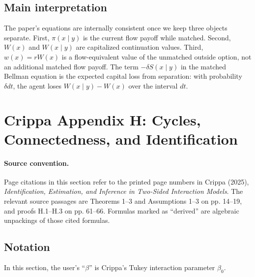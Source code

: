 \documentclass[11pt]{article}
\begin{document}
\subsection{Main interpretation}

The paper's equations are internally consistent once we keep three objects
separate. First, $\pi(x\mid y)$ is the current flow payoff while matched. Second,
$W(x)$ and $W(x\mid y)$ are capitalized continuation values. Third, $w(x)=rW(x)$
is a flow-equivalent value of the unmatched outside option, not an additional
matched flow payoff. The term $-\delta S(x\mid y)$ in the matched Bellman
equation is the expected capital loss from separation: with probability
$\delta dt$, the agent loses $W(x\mid y)-W(x)$ over the interval $dt$.

\section{Crippa Appendix H: Cycles, Connectedness, and Identification}

\paragraph{Source convention.}
Page citations in this section refer to the printed page numbers in Crippa
(2025), \emph{Identification, Estimation, and Inference in Two-Sided Interaction
Models}. The relevant source passages are Theorems 1--3 and Assumptions 1--3
on pp. 14--19, and proofs H.1--H.3 on pp. 61--66. Formulas marked as
``derived'' are algebraic unpackings of those cited formulas.

\subsection{Notation}

In this section, the user's ``$\beta$'' is Crippa's Tukey interaction parameter
$\beta_0$.
\end{document}
